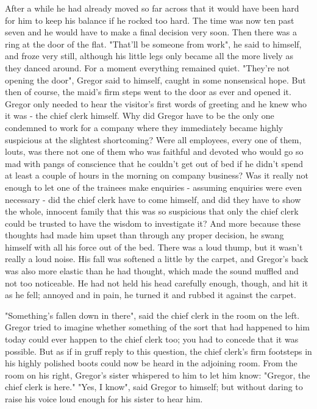 \documentclass[12pt]{book}
\begin{document}
    After a while he had already moved so far across that it would have been hard for him to keep his balance if he rocked too hard. The time was now ten past seven and he would have to make a final decision very soon. Then there was a ring at the door of the flat. "That'll be someone from work", he said to himself, and froze very still, although his little legs only became all the more lively as they danced around. For a moment everything remained quiet. "They're not opening the door", Gregor said to himself, caught in some nonsensical hope. But then of course, the maid's firm steps went to the door as ever and opened it. Gregor only needed to hear the visitor's first words of greeting and he knew who it was - the chief clerk himself. Why did Gregor have to be the only one condemned to work for a company where they immediately became highly suspicious at the slightest shortcoming? Were all employees, every one of them, louts, was there not one of them who was faithful and devoted who would go so mad with pangs of conscience that he couldn't get out of bed if he didn't spend at least a couple of hours in the morning on company business? Was it really not enough to let one of the trainees make enquiries - assuming enquiries were even necessary - did the chief clerk have to come himself, and did they have to show the whole, innocent family that this was so suspicious that only the chief clerk could be trusted to have the wisdom to investigate it? And more because these thoughts had made him upset than through any proper decision, he swang himself with all his force out of the bed. There was a loud thump, but it wasn't really a loud noise. His fall was softened a little by the carpet, and Gregor's back was also more elastic than he had thought, which made the sound muffled and not too noticeable. He had not held his head carefully enough, though, and hit it as he fell; annoyed and in pain, he turned it and rubbed it against the carpet.

    "Something's fallen down in there", said the chief clerk in the room on the left. Gregor tried to imagine whether something of the sort that had happened to him today could ever happen to the chief clerk too; you had to concede that it was possible. But as if in gruff reply to this question, the chief clerk's firm footsteps in his highly polished boots could now be heard in the adjoining room. From the room on his right, Gregor's sister whispered to him to let him know: "Gregor, the chief clerk is here." "Yes, I know", said Gregor to himself; but without daring to raise his voice loud enough for his sister to hear him.
\end{document}
